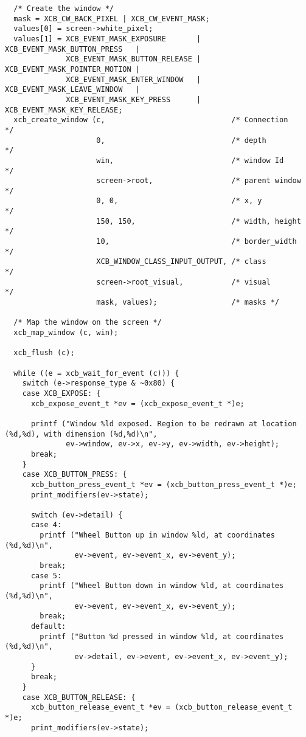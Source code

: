 \documentclass[12pt,oneside,titlepage]{book}
\begin{document}
\begin{enumerate}
\begin{enumerate}
\begin{verbatim}
  /* Create the window */
  mask = XCB_CW_BACK_PIXEL | XCB_CW_EVENT_MASK;
  values[0] = screen->white_pixel;
  values[1] = XCB_EVENT_MASK_EXPOSURE       | XCB_EVENT_MASK_BUTTON_PRESS   |
              XCB_EVENT_MASK_BUTTON_RELEASE | XCB_EVENT_MASK_POINTER_MOTION |
              XCB_EVENT_MASK_ENTER_WINDOW   | XCB_EVENT_MASK_LEAVE_WINDOW   |
              XCB_EVENT_MASK_KEY_PRESS      | XCB_EVENT_MASK_KEY_RELEASE;
  xcb_create_window (c,                             /* Connection          */
                     0,                             /* depth               */
                     win,                           /* window Id           */
                     screen->root,                  /* parent window       */
                     0, 0,                          /* x, y                */
                     150, 150,                      /* width, height       */
                     10,                            /* border_width        */
                     XCB_WINDOW_CLASS_INPUT_OUTPUT, /* class               */
                     screen->root_visual,           /* visual              */
                     mask, values);                 /* masks */

  /* Map the window on the screen */
  xcb_map_window (c, win);

  xcb_flush (c);

  while ((e = xcb_wait_for_event (c))) {
    switch (e->response_type & ~0x80) {
    case XCB_EXPOSE: {
      xcb_expose_event_t *ev = (xcb_expose_event_t *)e;

      printf ("Window %ld exposed. Region to be redrawn at location (%d,%d), with dimension (%d,%d)\n",
              ev->window, ev->x, ev->y, ev->width, ev->height);
      break;
    }
    case XCB_BUTTON_PRESS: {
      xcb_button_press_event_t *ev = (xcb_button_press_event_t *)e;
      print_modifiers(ev->state);

      switch (ev->detail) {
      case 4:
        printf ("Wheel Button up in window %ld, at coordinates (%d,%d)\n",
                ev->event, ev->event_x, ev->event_y);
        break;
      case 5:
        printf ("Wheel Button down in window %ld, at coordinates (%d,%d)\n",
                ev->event, ev->event_x, ev->event_y);
        break;
      default:
        printf ("Button %d pressed in window %ld, at coordinates (%d,%d)\n",
                ev->detail, ev->event, ev->event_x, ev->event_y);
      }
      break;
    }
    case XCB_BUTTON_RELEASE: {
      xcb_button_release_event_t *ev = (xcb_button_release_event_t *)e;
      print_modifiers(ev->state);


\end{verbatim}
\end{enumerate}
\end{enumerate}
\end{document}
